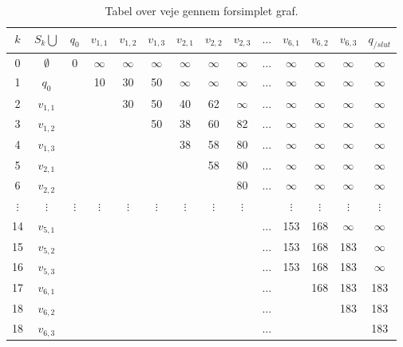 \begin{table}[H]
\centering
\begin{tabular}{|c|c|c|c|c|c|c|c|c|c|c|c|c|c|} 
\hline
$k$ & $S_{k} \bigcup$ & $q_{0}$ & $v_{1,1}$ & $v_{1,2}$ & $v_{1,3}$ & $v_{2,1}$ & $v_{2,2}$ & $v_{2,3}$ & $\ldots$ & $v_{6,1}$ & $v_{6,2}$ & $v_{6,3}$ & $q_{/slut}$ \\
\hline
0 & $\emptyset$ & 0 & $\infty$ & $\infty$ & $\infty$ & $\infty$ & $\infty$ & $\infty$ & $\ldots$ & $\infty$ & $\infty$ & $\infty$ & $\infty$ \\ 
1 & $q_{0}$ & & 10 & 30 & 50 & $\infty$ & $\infty$ & $\infty$ & $\ldots$ & $\infty$ & $\infty$ & $\infty$ & $\infty$\\ 
2 & $v_{1,1}$ & & & 30 & 50 & 40 & 62 & $\infty$ & $\ldots$ & $\infty$ & $\infty$ & $\infty$ & $\infty$\\ 
3 & $v_{1,2}$ & & & & 50 & 38 & 60 & 82 & $\ldots$ & $\infty$ & $\infty$ & $\infty$ & $\infty$\\
4 & $v_{1,3}$ & & & & & 38 & 58 & 80 & $\ldots$ & $\infty$ & $\infty$ & $\infty$ & $\infty$\\ 
5 & $v_{2,1}$ & & & & & & 58 & 80 & $\ldots$ & $\infty$ & $\infty$ & $\infty$ & $\infty$\\ 
6 & $v_{2,2}$ & & & & & & & 80 & $\ldots$ & $\infty$ & $\infty$ & $\infty$ & $\infty$\\  
$\vdots$ & $\vdots$ & $\vdots$ & $\vdots$ & $\vdots$ & $\vdots$ & $\vdots$ & $\vdots$ & $\vdots$ &  & $\vdots$ & $\vdots$ & $\vdots$ & $\vdots$\\ 
14 & $v_{5,1}$ &  &  &  &  &  &  &  & $\ldots$ & 153 & 168 & $\infty$ & $\infty$\\ 
15 & $v_{5,2}$ &  &  &  &  &  &  &  & $\ldots$ & 153 & 168 & 183 & $\infty$\\ 
16 & $v_{5,3}$ &  &  &  &  &  &  &  & $\ldots$ & 153 & 168 & 183 & $\infty$\\ 
17 & $v_{6,1}$ &  &  &  &  &  &  &  & $\ldots$ &  & 168 & 183 & 183\\ 
18 & $v_{6,2}$ &  &  &  &  &  &  &  & $\ldots$ &  &  & 183 & 183\\ 
18 & $v_{6,3}$ &  &  &  &  &  &  &  & $\ldots$ &  &  &  & 183\\ 
\hline
\end{tabular}
\caption{Tabel over veje gennem forsimplet graf.}
\label{table:forsimplet_graf}
\end{table}